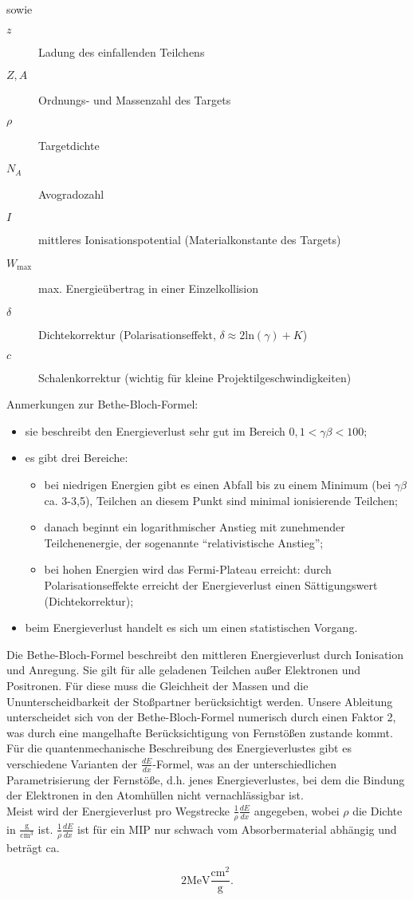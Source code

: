 sowie
\begin{description}
\item[$z$]Ladung des einfallenden Teilchens
\item[$Z, A$] Ordnungs- und Massenzahl des Targets
\item[$\rho$] Targetdichte
\item[$N_A$] Avogradozahl
\item[$I$] mittleres Ionisationspotential (Materialkonstante des Targets)
\item[$W_{\text{max}}$] max. Energieübertrag in einer Einzelkollision
\item[$\delta$] Dichtekorrektur (Polarisationseffekt, $\delta \approx 2\text{ln}(\gamma)+K$)
\item[$c$] Schalenkorrektur (wichtig für kleine Projektilgeschwindigkeiten)
\end{description}


Anmerkungen zur Bethe-Bloch-Formel:
\begin{itemize}
  \item sie beschreibt den Energieverlust sehr gut im Bereich $0,1 < \gamma\beta < 100$;
  \item es gibt drei Bereiche:
  			\begin{itemize}
  			  \item bei niedrigen Energien gibt es einen Abfall bis zu einem Minimum (bei $\gamma\beta$
  			  ca. 3-3,5), Teilchen an diesem Punkt sind minimal ionisierende Teilchen;
  			  \item danach beginnt ein logarithmischer Anstieg mit zunehmender Teilchenenergie, der
  			  sogenannte "`relativistische Anstieg"';
  			  \item bei hohen Energien wird das Fermi-Plateau erreicht: durch Polarisationseffekte erreicht
  			  der Energieverlust  einen Sättigungswert (Dichtekorrektur);
  			  \end{itemize}
  \item beim Energieverlust handelt es sich um einen statistischen Vorgang.
\end{itemize}

Die Bethe-Bloch-Formel beschreibt den mittleren Energieverlust durch Ionisation und Anregung. Sie
gilt für alle geladenen Teilchen außer Elektronen und Positronen. Für diese muss die Gleichheit der
Massen und die Ununterscheidbarkeit der Stoßpartner berücksichtigt werden. Unsere Ableitung
unterscheidet sich von der Bethe-Bloch-Formel numerisch durch einen Faktor 2, was durch eine
mangelhafte Berücksichtigung von Fernstößen zustande kommt. Für die quantenmechanische Beschreibung
des Energieverlustes gibt es verschiedene Varianten der $\frac{dE}{dx}$-Formel, was an der
unterschiedlichen Parametrisierung der Fernstöße, d.h. jenes Energieverlustes, bei dem die Bindung
der Elektronen in den Atomhüllen nicht vernachlässigbar ist.
\\
Meist wird der Energieverlust pro Wegstrecke $\frac{1}{\rho}\frac{dE}{dx}$ angegeben, wobei $\rho$
die Dichte in $\frac{\text{g}}{\text{cm}^3}$ ist. $\frac{1}{\rho}\frac{dE}{dx}$ ist für ein MIP nur
schwach vom Absorbermaterial abhängig und beträgt ca. 

\[2 \text{MeV}\frac{\text{cm}^2}{\text{g}}.\]